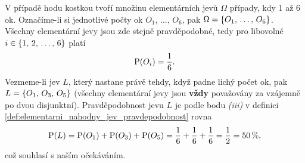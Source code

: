 \begin{example}
    V případě hodu kostkou tvoří množinu elementárních jevů $\Omega$ případy, kdy 1 až 6 ok. Označíme-li si jednotlivé počty ok $O_1,\,\dots,\,O_6$, pak $\Omega=\left\{O_1,\,\dots,\,O_6\right\}$. Všechny elementární jevy jsou zde stejně pravděpodobné, tedy pro libovolné $i\in\left\{1,\,2,\,\dots,\,6\right\}$ platí
    \[\operatorname{P}(O_i)=\dfrac{1}{6}.\]
    Vezmeme-li jev $L$, který nastane právě tehdy, když padne lichý počet ok, pak $L=\left\{O_1,\,O_3,\,O_5\right\}$ (všechny elementární jevy jsou \textbf{vždy} považovány za vzájemně po dvou disjunktní). Pravděpodobnost jevu $L$ je podle bodu \textit{(iii)} v definici \ref{def:elementarni_nahodny_jev_pravdepodobnost} rovna
    \[\operatorname{P}(L)=\operatorname{P}(O_1)+\operatorname{P}(O_3)+\operatorname{P}(O_5)=\dfrac{1}{6}+\dfrac{1}{6}+\dfrac{1}{6}=\dfrac{1}{2}=50\,\%,\]
    což souhlasí s naším očekáváním.
\end{example}
